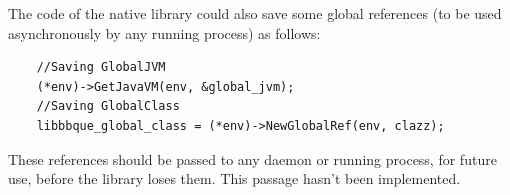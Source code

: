 The code of the native library could also save some global references (to be used asynchronously by any running process) as follows:
\begin{verbatim}
	//Saving GlobalJVM
	(*env)->GetJavaVM(env, &global_jvm);
	//Saving GlobalClass
	libbbque_global_class = (*env)->NewGlobalRef(env, clazz);
\end{verbatim}
These references should be passed to any daemon or running process, for future use, before the library loses them. This passage hasn't been implemented.